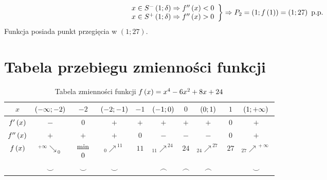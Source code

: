 \documentclass[a4paper,12pt]{article}
\newcommand{\fodx}{
		\ensuremath f \left( x \right)
	}
\newcommand{\podx}{
		\ensuremath f' \left( x \right)
	}
\newcommand{\dodx}{
		\ensuremath f'' \left( x \right)
	}
\newcommand{\naw}[1]{
		\ensuremath \left( #1 \right)
	}
\newcommand{\dnj}[2]{
	\ensuremath  \begin{array}{c}
		#1\\
		#2
	\end{array} 
}
\begin{document}
\[ \left.
		\begin{array}{l}
			x \in S^- \left(1; \delta \right) \Rightarrow \dodx < 0 \\
			x \in S^+ \left(1; \delta \right) \Rightarrow \dodx > 0
		\end{array}
	\right\} \Rightarrow P_2 = \left(1; f \left(1 \right) \right) = \left( 1; 27 \right) \text{ p.p.}
\]
Funkcja posiada punkt przegięcia w $\left( 1; 27 \right)$.

\section{Tabela przebiegu zmienności funkcji}

\begin{table}[h]
	\centering
	\begin{tabular}{c|c|c|c|c|c|c|c|c|c|}
		$x$	& $\naw{ -\infty; -2}$	& $-2$	& $\naw{ -2; -1}$	& $-1$	& $\naw{-1; 0}$	& $0$	& $\naw{0;1}$	& $1$	& $\naw{1; +\infty}$	\\ \hline 
		$\podx$	& $-$			& $0$	& $+$			& $+$	& $+$		& $+$	& $+$		& $0$	& $+$			\\ \hline
		$\dodx$	& $+$			& $+$	& $+$			& $0$	& $-$		& $-$	& $-$		& $0$	& $+$			\\ \hline
		$\fodx$	& $^{+\infty} \searrow_{\:0}$	& $\dnj{\min}{0}$	& $_0 \nearrow^{\: 11}$	& $11$	& $_{11}\nearrow^{\: 24}$	& $24$	& $_{24}\nearrow^{\: 27}$	& $27$	& $_{27}\nearrow^{\: + \infty}$ \\
			& $\smile$		& $\smile$	& $\smile$	& 	& $\frown$	& $\frown$	& $\frown$ 	&	& $\smile$
	\end{tabular}
	\caption{Tabela zmienności funkcji $\fodx = x^4 - 6x^2 + 8x + 24$}
	\label{tab:tabelken}
\end{table}
\end{document}
